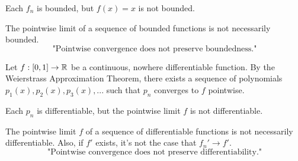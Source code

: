 \begin{observation}
    Each $f_n$ is bounded, but $f(x) = x$ is not bounded.
\end{observation}

\begin{remark}
    The pointwise limit of a sequence of bounded functions is not necessarily bounded.
    $$\text{"Pointwise convergence does not preserve boundedness."}$$
\end{remark}

\begin{example}
    Let $f:[0,1] \to \mathbb{R}$ be a continuous, nowhere differentiable function. By the Weierstrass Approximation Theorem, there exists a sequence of polynomials $p_1(x), p_2(x), p_3(x),...$ such that $p_n$ converges to $f$ pointwise.
\end{example}

\begin{observation}
    Each $p_n$ is differentiable, but the pointwise limit $f$ is not differentiable.
\end{observation}

\begin{remark}
    The pointwise limit $f$ of a sequence of differentiable functions is not necessarily differentiable. Also, if $f'$ exists, it's not the case that $f_n' \to f'$.
    $$\text{"Pointwise convergence does not preserve differentiability."}$$
\end{remark}


